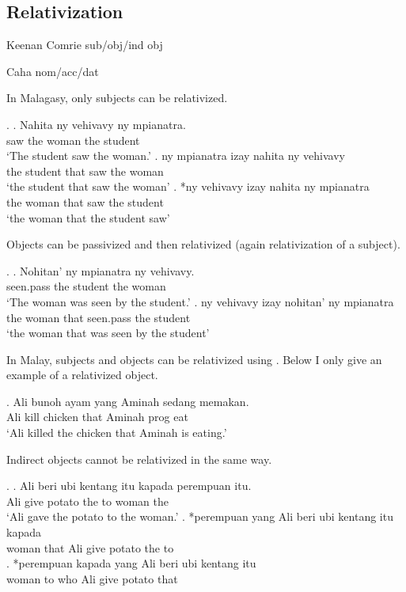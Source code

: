 \subsection{Relativization}

Keenan Comrie sub/obj/ind obj

Caha nom/acc/dat

In Malagasy, only subjects can be relativized.

\ex.
\ag. Nahita ny vehivavy ny mpianatra.\\
 saw the woman the student\\
 `The student saw the woman.'
\bg. ny mpianatra izay nahita ny vehivavy\\
 the student that saw the woman\\
 `the student that saw the woman'
\bg. *ny vehivavy izay nahita ny mpianatra\\
 the woman that saw the student\\
 `the woman that the student saw' 

Objects can be passivized and then relativized (again relativization of a subject).

\ex.
\ag. Nohitan' ny mpianatra ny vehivavy.\\
 seen.\ac{pass} the student the woman\\
 `The woman was seen by the student.'
\bg. ny vehivavy izay nohitan' ny mpianatra\\
 the woman that seen.\ac{pass} the student\\
 `the woman that was seen by the student' 

In Malay, subjects and objects can be relativized using . Below I only give an example of a relativized object.

\exg. Ali bunoh ayam yang Aminah sedang memakan.\\
 Ali kill chicken that Aminah \ac{prog} eat\\
 `Ali killed the chicken that Aminah is eating.' 

Indirect objects cannot be relativized in the same way.

\ex.
\ag. Ali beri {ubi kentang} itu kapada perempuan itu.\\
 Ali give potato the to woman the\\
 `Ali gave the potato to the woman.'
\bg. *perempuan yang Ali beri {ubi kentang} itu kapada\\
 woman that Ali give potato the to\\
\bg. *perempuan kapada yang Ali beri {ubi kentang} itu\\
 woman to who Ali give potato that\\ 

